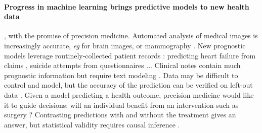 \documentclass{report}
\begin{document}
\paragraph{Progress in machine learning brings predictive models to new health
  data} \citep{beam2018big,rajkomar2019machine}, with the promise of
precision medicine.
Automated analysis of
medical images is increasingly accurate, \emph{eg} for brain images,
\citep{khojaste2022deep,zhang2019radiological} or mammography
\citep{yala2019deep,shen2019deep,nassif2022breast}.
New prognostic models leverage routinely-collected
patient records
\citep{mooney2018bigdata}: predicting heart
failure from claims \citep{desai2020comparison}, suicide attempts
from questionnaires \citep{simon2018predicting}...
Clinical notes contain much prognostic information
but require text modeling  \citep{horng2017creating,wang2020prediction,spasic2020clinical}.
Data may be difficult to
control and model, but the accuracy of the prediction can be verified
on left-out data
\citep{altman2009prognosis,poldrack2020establishment,varoquaux2022evaluating}.
Given a model predicting a health outcome, precision medicine
would like it to guide decisions: will an individual benefit from an
intervention such as surgery \citep{fontana2019can}?
Contrasting predictions with and without the treatment gives an answer,
but statistical validity requires causal inference
\citep{snowden_implementation_2011,blakely2020reflection}.


\end{document}
